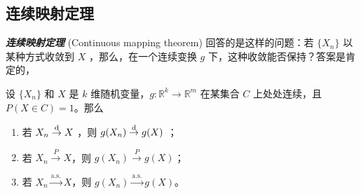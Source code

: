 \subsection{连续映射定理}

\textbf{\emph{连续映射定理}} (Continuous mapping theorem) 回答的是这样的问题：若 $\{X_n\}$ 以某种方式收敛到 $X$ ，那么，在一个连续变换 $g$ 下，这种收敛能否保持？答案是肯定的，

\begin{theorem}[连续映射定理]\label{thm:ch1:continuous-mapping}

\label{thm:ch1:1-4}

设 $\{X_n\}$ 和 $X$ 是 $k$ 维随机变量，$g:\mathbb R^k\to\mathbb R^m$ 在某集合 $C$ 上处处连续，且 $P(X\in C)=1$。那么

\begin{enumerate}
\def\labelenumi{\arabic{enumi}.}
\tightlist
\item
  若 $X_n\overset{\rm d}\to X$ ，则 $g(X_n)\overset{\rm d}\to g(X)$ ；
\item
  若 $X_n \overset{P}\to X$，则 $g(X_n) \overset{P}\to g(X)$；
\item
  若 $X_n \overset{\text{a.s.}}\to X$，则 $g(X_n) \overset{\text{a.s.}}\to g(X)$。
\end{enumerate}

\end{theorem}

